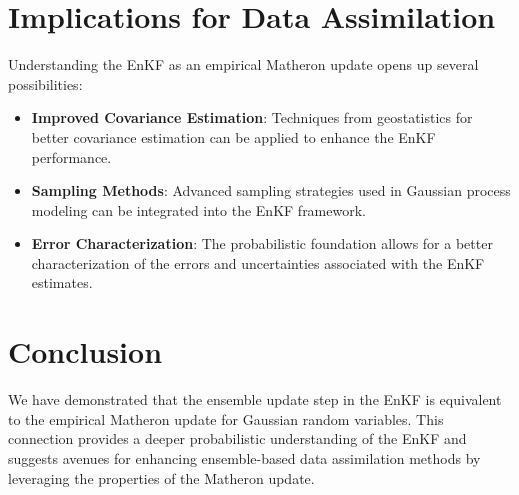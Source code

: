 \documentclass{article}
\theoremstyle{plain}
\begin{document}
\section{Implications for Data Assimilation}

Understanding the EnKF as an empirical Matheron update opens up several possibilities:

\begin{itemize}
    \item \textbf{Improved Covariance Estimation}: Techniques from geostatistics for better covariance estimation can be applied to enhance the EnKF performance.
    \item \textbf{Sampling Methods}: Advanced sampling strategies used in Gaussian process modeling can be integrated into the EnKF framework.
    \item \textbf{Error Characterization}: The probabilistic foundation allows for a better characterization of the errors and uncertainties associated with the EnKF estimates.
\end{itemize}

\section{Conclusion}

We have demonstrated that the ensemble update step in the EnKF is equivalent to the empirical Matheron update for Gaussian random variables. This connection provides a deeper probabilistic understanding of the EnKF and suggests avenues for enhancing ensemble-based data assimilation methods by leveraging the properties of the Matheron update.




\end{document}
